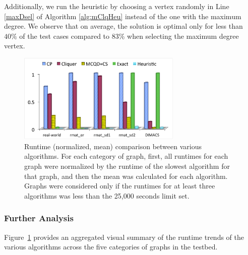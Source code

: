 Additionally, we run the heuristic by choosing a vertex randomly in Line \ref{maxDsel} of Algorithm \ref{alg:mClqHeu} instead of the one with the maximum degree. We observe that on average, the solution is optimal only for less than $40\%$ of the test cases compared to 83\% when selecting the maximum degree vertex.


\begin{figure}
  \centering
    \includegraphics[width=7.8cm]{maxclqplot.pdf}
  \caption{Runtime (normalized, mean) comparison between various algorithms. For each category of graph, first, all runtimes for each graph were normalized by the runtime of the slowest algorithm for that graph, and then the mean was calculated for each algorithm. Graphs were considered only if the runtimes for at least three algorithms was less than the 25,000 seconds limit set.}
\label{fig-timeplot}
\end{figure}




\subsubsection{Further Analysis}
\label{sec:exp-further}

Figure~\ref{fig-timeplot} provides an aggregated visual summary of the runtime trends of
the various algorithms across the five categories of graphs in the testbed. 


